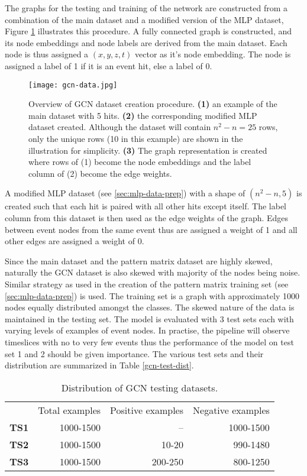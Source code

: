 The graphs for the testing and training of the network are constructed
from a combination of the main dataset and a modified version of the
MLP dataset, Figure \ref{fig:gcn-data} illustrates this procedure. A
fully connected graph is constructed, and its node embeddings and node
labels are derived from the main dataset. Each node is thus assigned a
$(x,y,z,t)$ vector as it's node embedding. The node is assigned a
label of 1 if it is an event hit, else a label of 0.

\begin{figure}[htb]
  \centering
  \texttt{[image: gcn-data.jpg]}
  \caption{Overview of GCN dataset creation procedure. \textbf{(1)} an
    example of the main dataset with 5 hits. \textbf{(2)} the
    corresponding modified MLP dataset created. Although the dataset
    will contain $n^{2}-n = 25$ rows, only the unique rows (10 in this
    example) are shown in the illustration for simplicity.
    \textbf{(3)} The graph representation is created where rows of (1)
    become the node embeddings and the label column of (2) become the
    edge weights.}
  \label{fig:gcn-data}
\end{figure}

A modified MLP dataset (see \ref{sec:mlp-data-prep}) with a shape of
\texttt{$(n^{2}-n, 5)$} is created such that each hit is paired with
all other hits except itself. The label column from this dataset is
then used as the edge weights of the graph. Edges between event nodes
from the same event thus are assigned a weight of 1 and all other
edges are assigned a weight of 0.

Since the main dataset and the pattern matrix dataset are highly
skewed, naturally the GCN dataset is also skewed with majority of the
nodes being noise. Similar strategy as used in the creation of the
pattern matrix training set (see \ref{sec:mlp-data-prep}) is used. The
training set is a graph with approximately 1000 nodes equally
distributed amongst the classes. The skewed nature of the data is
maintained in the testing set. The model is evaluated with 3 test sets
each with varying levels of examples of event nodes. In practise, the
pipeline will observe timeslices with no to very few events thus the
performance of the model on test set 1 and 2 should be given
importance. The various test sets and their distribution are
summarized in Table \ref{gcn-test-dist}.

\begin{table}[htb]
  \centering
  \caption{Distribution of GCN testing datasets.}
  \begin{tabular}{lrrr}
    & Total examples & Positive examples & Negative examples \\
    \textbf{TS1} & 1000-1500 & -- & 1000-1500 \\
    \textbf{TS2} & 1000-1500 & 10-20 & 990-1480 \\
    \textbf{TS3} & 1000-1500 & 200-250 & 800-1250 \\
  \end{tabular}
  \label{tab:gcn-test-dst}
\end{table}

